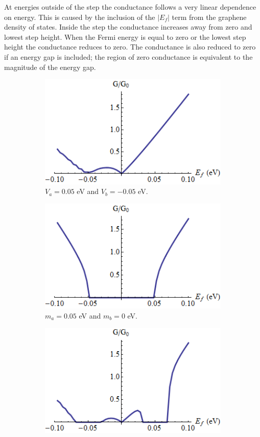 			At energies outside of the step the conductance follows a very linear dependence on energy. This is caused by the inclusion of the $|E_{f}|$ term from the graphene density of states. Inside the step the conductance increases away from zero and lowest step height. When the Fermi energy is equal to zero or the lowest step height the conductance reduces to zero. The conductance is also reduced to zero if an energy gap is included; the region of zero conductance is equivalent to the magnitude of the energy gap.
		\begin{figure}[h]
			 \begin{subfigure}[h]{0.3\textwidth}
				\centerline{\includegraphics[scale=0.35]{images/step-g-1}}
				\caption{$V_{a}=0.05$ eV and $V_{b}=-0.05$ eV.}
			\end{subfigure}
			\hspace{0.5cm}
			\begin{subfigure}[h]{0.3\textwidth}
				\centerline{\includegraphics[scale=0.35]{images/step-g-2}}
				\caption{$m_{a}=0.05$ eV and $m_{b}=0$ eV.}
			\end{subfigure}
			\hspace{0.5cm}
			\begin{subfigure}[h]{0.3\textwidth}
				\centerline{\includegraphics[scale=0.35]{images/step-g-3}}

\end{subfigure}
\end{figure}
